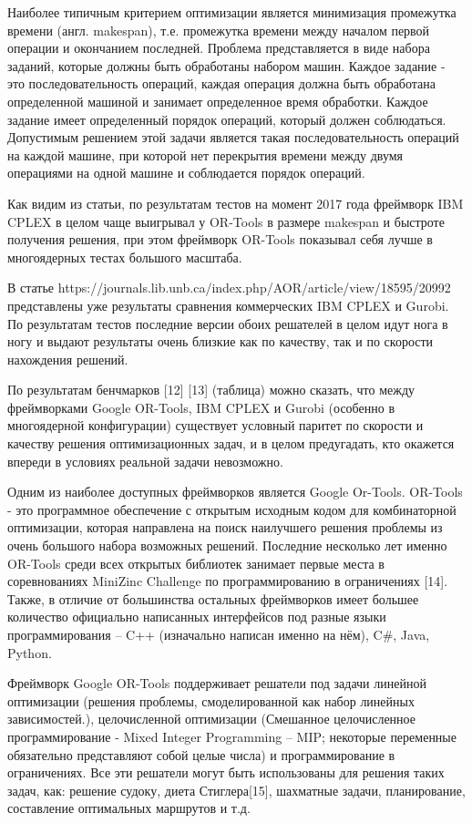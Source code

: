 Наиболее типичным критерием оптимизации является минимизация промежутка времени (англ. makespan), т.е. промежутка времени между началом первой операции и окончанием последней. Проблема представляется в виде набора заданий, которые должны быть обработаны набором машин. Каждое задание - это последовательность операций, каждая операция должна быть обработана определенной машиной и занимает определенное время обработки. Каждое задание имеет определенный порядок операций, который должен соблюдаться. Допустимым решением этой задачи является такая последовательность операций на каждой машине, при которой нет перекрытия времени между двумя операциями на одной машине и соблюдается порядок операций.

Как видим из статьи, по результатам тестов на момент 2017 года фреймворк IBM CPLEX в целом чаще выигрывал у OR-Tools в размере makespan и быстроте получения решения, при этом фреймворк OR-Tools показывал себя лучше в многоядерных тестах большого масштаба.

В статье https://journals.lib.unb.ca/index.php/AOR/article/view/18595/20992 представлены уже результаты сравнения коммерческих IBM CPLEX и Gurobi. По результатам тестов последние версии обоих решателей в целом идут нога в ногу и выдают результаты очень близкие как по качеству, так и по скорости нахождения решений.

По результатам бенчмарков [12] [13] (таблица) можно сказать, что между фреймворками Google OR-Tools, IBM CPLEX и Gurobi (особенно в многоядерной конфигурации) существует условный паритет по скорости и качеству решения оптимизационных задач, и в целом предугадать, кто окажется впереди в условиях реальной задачи невозможно.

Одним из наиболее доступных фреймворков является Google Or-Tools. OR-Tools - это программное обеспечение с открытым исходным кодом для комбинаторной оптимизации, которая направлена на поиск наилучшего решения проблемы из очень большого набора возможных решений. Последние несколько лет именно OR-Tools среди всех открытых библиотек занимает первые места в соревнованиях MiniZinc Challenge по программированию в ограничениях [14]. Также, в отличие от большинства остальных фреймворков имеет большее количество официально написанных интерфейсов под разные языки программирования – C++ (изначально написан именно на нём), C\#, Java, Python.

Фреймворк Google OR-Tools поддерживает решатели под задачи линейной оптимизации (решения проблемы, смоделированной как набор линейных зависимостей.), целочисленной оптимизации (Смешанное целочисленное программирование - Mixed Integer Programming – MIP; некоторые переменные обязательно представляют собой целые числа) и программирование в ограничениях. Все эти решатели могут быть использованы для решения таких задач, как: решение судоку, диета Стиглера[15], шахматные задачи, планирование, составление оптимальных маршрутов и т.д.

